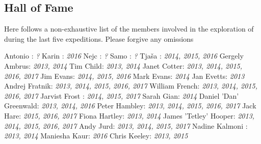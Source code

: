 \begin{fullwidth} \chapter{Hall of Fame} 

Here follows a non-exhaustive list of the members involved in the exploration of  during the last five expeditions. Please forgive any omissions 

\begin{multicols}{2} 
Antonio : \textsl{? }
\newline
Karin : \textsl{2016 }
\newline
Nejc : \textsl{? }
\newline
Samo : \textsl{? }
\newline
Tja\v{s}a : \textsl{2014, 2015, 2016 }
\newline
Gergely Ambrus: \textsl{2013, 2014 }
\newline
Tim Child: \textsl{2013, 2014 }
\newline
Janet Cotter: \textsl{2013, 2014, 2015, 2016, 2017 }
\newline
Jim Evans: \textsl{2014, 2015, 2016 }
\newline
Mark Evans: \textsl{2014 }
\newline
Jan Evetts: \textsl{2013 }
\newline
Andrej Fratnik: \textsl{2013, 2014, 2015, 2016, 2017 }
\newline
William French: \textsl{2013, 2014, 2015, 2016, 2017 }
\newline
Jarvist Frost : \textsl{2014, 2015, 2017 }
\newline
Sarah Gian: \textsl{2014 }
\newline
Daniel 'Dan' Greenwald: \textsl{2013, 2014, 2016 }
\newline
Peter Hambley: \textsl{2013, 2014, 2015, 2016, 2017 }
\newline
Jack Hare: \textsl{2015, 2016, 2017 }
\newline
Fiona Hartley: \textsl{2013, 2014 }
\newline
James 'Tetley' Hooper: \textsl{2013, 2014, 2015, 2016, 2017 }
\newline
Andy Jurd: \textsl{2013, 2014, 2015, 2017 }
\newline
Nadine Kalmoni : \textsl{2013, 2014 }
\newline
Maniesha Kaur: \textsl{2016 }
\newline
Chris Keeley: \textsl{2013, 2015 }
\newline

\end{multicols}
\end{fullwidth}
